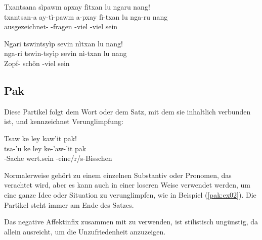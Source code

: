 \begin{interlin}
	\glll Txantsana sìpawm apxay fìtxan lu ngaru nang! \\
	txantsan-a ay-tì-pawm a-pxay fì-txan lu nga-ru nang \\
	ausgezeichnet- -fragen -viel -viel sein   \\
\end{interlin}

\begin{interlin}
	\glll \Npawl{}Ngari tswintsyìp sevin nìtxan lu nang! \\
	nga-ri tswin-tsyìp sevin nì-txan lu nang \\
	 Zopf- schön -viel sein  \\
\end{interlin}

\subsection{Pak} 
Diese Partikel folgt dem Wort oder dem Satz, mit dem sie inhaltlich verbunden ist, und kennzeichnet Verunglimpfung:

\begin{interlin} \label{pak:ex02}
	\glll \Npawl{}Tsaw ke ley kaw'it pak! \\
	tsa-'u ke ley ke-'aw-'it pak \\
	-Sache  wert.sein -eine/r/s-Bisschen  \\
\end{interlin}

\noindent Normalerweise gehört  zu einem einzelnen Substantiv oder Pronomen, das verachtet wird, aber es kann auch in einer loseren Weise verwendet werden, um eine ganze Idee oder Situation zu verunglimpfen, wie in Beispiel (\ref{pak:ex02}). Die Partikel steht immer am Ende des Satzes.

Das negative Affektinfix  zusammen mit  zu verwenden, ist stilistisch ungünstig, da  allein ausreicht, um die Unzufriedenheit anzuzeigen. 

